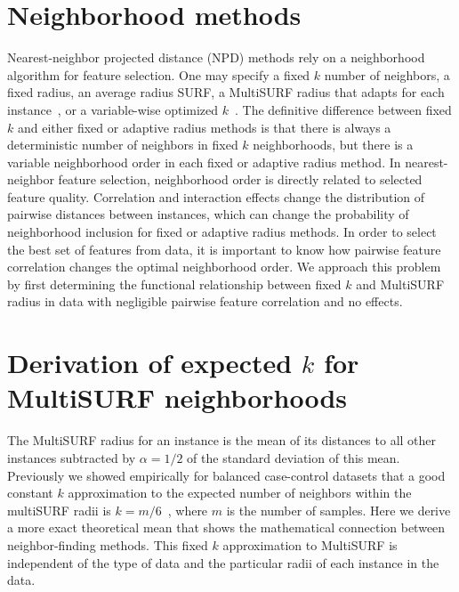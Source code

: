\documentclass[10pt,letterpaper]{article}
\begin{document}
\section{Neighborhood methods}
Nearest-neighbor projected distance (NPD) methods rely on a neighborhood algorithm for feature selection. One may specify a fixed $k$ number of neighbors, a fixed radius, an average radius SURF, a MultiSURF radius that adapts for each instance~\cite{urbanowicz17}, or a variable-wise optimized $k$~\cite{mckinney13}. The definitive difference between fixed $k$ and either fixed or adaptive radius methods is that there is always a deterministic number of neighbors in fixed $k$ neighborhoods, but there is a variable neighborhood order in each fixed or adaptive radius method. In nearest-neighbor feature selection, neighborhood order is directly related to selected feature quality. Correlation and interaction effects change the distribution of pairwise distances between instances, which can change the probability of neighborhood inclusion for fixed or adaptive radius methods. In order to select the best set of features from data, it is important to know how pairwise feature correlation changes the optimal neighborhood order. We approach this problem by first determining the functional relationship between fixed $k$ and MultiSURF radius in data with negligible pairwise feature correlation and no effects.

\section{Derivation of expected \texorpdfstring{$k$}{} for MultiSURF neighborhoods}\label{sec:expected-k}
The MultiSURF radius for an instance is the mean of its distances to all other instances subtracted by $\alpha=1/2$ of the standard deviation of this mean. Previously we showed empirically for balanced case-control datasets that a good constant $k$ approximation to the expected number of neighbors within the multiSURF radii is $k=m/6$~\cite{stir}, where $m$ is the number of samples. Here we derive a more exact theoretical mean that shows the mathematical connection between neighbor-finding methods. This fixed $k$ approximation to MultiSURF is independent of the type of data and the particular radii of each instance in the data.
\end{document}
